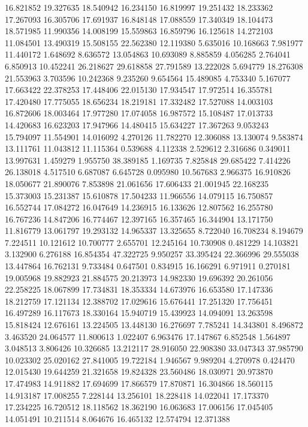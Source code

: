 16.821852
19.327635
18.540942
16.234150
16.819997
19.251432
18.233362
17.267093
16.305706
17.691937
16.848148
17.088559
17.340349
18.104473
18.571985
11.990356
14.008199
15.559863
16.859796
16.125618
14.272103
11.084501
13.490319
15.508155
22.562380
12.119380
5.635016
10.168663
7.981977
11.440172
1.648692
8.636572
13.054863
10.693089
8.885859
4.056285
2.764041
6.850913
10.452241
26.218627
29.618858
27.791589
13.222028
5.694779
18.276308
21.553963
3.703596
10.242368
9.235260
9.654564
15.489085
4.753340
5.167077
17.663422
22.378253
17.448406
22.015130
17.934547
17.972514
16.355781
17.420480
17.775055
18.656234
18.219181
17.332482
17.527088
14.003103
16.872606
18.003464
17.977280
17.074058
16.987572
15.108487
17.013733
14.420683
16.623203
17.947966
14.480415
15.634227
17.367263
9.053243
15.794097
11.554901
14.016092
4.270126
11.782270
12.306088
13.130074
9.583874
13.111761
11.043812
11.115364
0.539688
4.112338
2.529612
2.316686
0.349011
13.997631
1.459279
1.955750
38.389185
1.169735
7.825848
29.685422
7.414226
26.138018
4.517510
6.687087
6.645728
0.095980
10.567683
2.966375
16.910826
18.050677
21.890076
7.853898
21.061656
17.606433
21.001945
22.168235
15.373003
15.231387
15.610878
17.504233
11.966556
14.079115
16.750857
16.552744
17.084272
16.047649
14.236915
16.133626
12.807562
16.255780
16.767236
14.847206
16.774467
12.397165
16.357465
16.344904
13.171750
11.816779
13.061797
19.293132
14.965337
13.325655
8.722040
16.708234
8.194679
7.224511
10.121612
10.700777
2.655701
12.245164
10.730908
0.481229
14.103821
3.132900
6.276188
16.854354
47.322725
9.950257
33.395424
22.366996
29.555038
13.447864
16.762131
9.733484
0.647501
0.834915
16.166291
6.971911
0.270181
19.005968
19.882923
21.884575
20.213973
14.982330
19.696392
20.261056
22.258225
18.067899
17.734831
18.353334
14.673976
16.653580
17.147336
18.212759
17.121134
12.388702
17.029616
15.676441
17.251320
17.756451
16.497289
16.117673
18.330164
15.940719
15.439923
14.094091
13.263598
15.818424
12.676161
13.224505
13.448130
16.276697
7.785241
14.343801
8.496872
3.463520
24.064577
11.800613
1.022407
6.963476
17.147867
6.852548
1.564897
3.048513
3.806426
10.326685
13.212117
28.916050
22.908380
33.047343
37.985790
10.023302
25.020162
27.841005
19.722184
1.946567
9.989204
4.270978
0.424470
12.015430
19.644259
21.321658
19.824328
23.560486
18.030971
20.973870
17.474983
14.911882
17.694699
17.866579
17.870871
16.304866
18.560115
14.913187
17.008255
7.228144
13.256101
18.228418
14.022041
17.173370
17.234225
16.720512
18.118562
18.362190
16.063683
17.006156
17.045405
14.051491
10.211514
8.064676
16.465132
12.574794
12.371388
